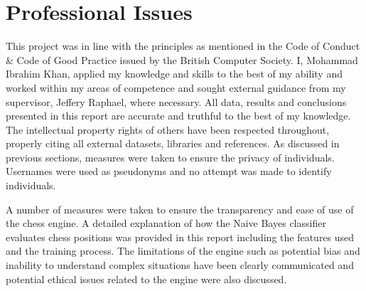 \section{Professional Issues}

This project was in line with the principles as mentioned in the Code of Conduct \& Code of Good Practice issued by the British Computer Society. I, Mohammad Ibrahim Khan, applied my knowledge and skills to the best of my ability and worked within my areas of competence and sought external guidance from my supervisor, Jeffery Raphael, where necessary. All data, results and conclusions presented in this report are accurate and truthful to the best of my knowledge. The intellectual property rights of others have been respected throughout, properly citing all external datasets, libraries and references. As discussed in previous sections, measures were taken to ensure the privacy of individuals. Usernames were used as pseudonyms and no attempt was made to identify individuals.  

A number of measures were taken to ensure the transparency and ease of use of the chess engine. A detailed explanation of how the Naive Bayes classifier evaluates chess positions was provided in this report including the features used and the training process. The limitations of the engine such as potential bias and inability to understand complex situations have been clearly communicated and potential ethical issues related to the engine were also discussed. 